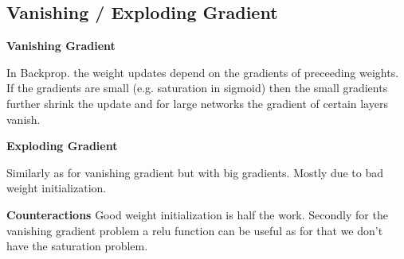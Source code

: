\subsection{Vanishing / Exploding Gradient}

\textbf{Vanishing Gradient}

In Backprop. the weight updates depend on the gradients of preceeding weights. If the gradients are small (e.g. saturation in sigmoid) then the small gradients further shrink the update and for large networks the gradient of certain layers vanish.

\textbf{Exploding Gradient}

Similarly as for vanishing gradient but with big gradients. Mostly due to bad weight initialization.

\textbf{Counteractions}
Good weight initialization is half the work. Secondly for the vanishing gradient problem a relu function can be useful as for that we don't have the saturation problem.
